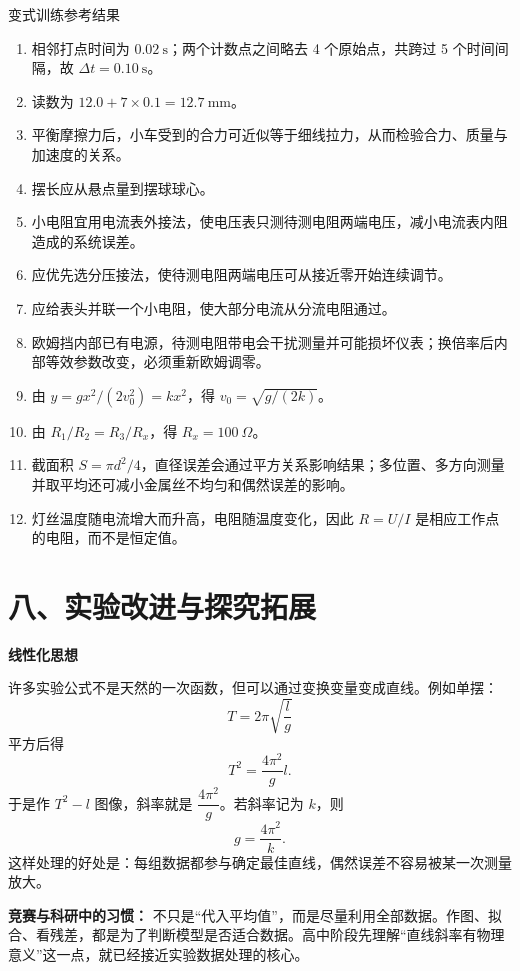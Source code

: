 \pagebreak
\begin{learningbox}{变式训练参考结果}
\begin{enumerate}[itemsep=0.45em,topsep=0.3em,parsep=0pt]
  \item 相邻打点时间为 $0.02\ \mathrm s$；两个计数点之间略去 4 个原始点，共跨过 5 个时间间隔，故 $\Delta t=0.10\ \mathrm s$。
  \item 读数为 $12.0+7\times0.1=12.7\ \mathrm{mm}$。
  \item 平衡摩擦力后，小车受到的合力可近似等于细线拉力，从而检验合力、质量与加速度的关系。
  \item 摆长应从悬点量到摆球球心。
  \item 小电阻宜用电流表外接法，使电压表只测待测电阻两端电压，减小电流表内阻造成的系统误差。
  \item 应优先选分压接法，使待测电阻两端电压可从接近零开始连续调节。
  \item 应给表头并联一个小电阻，使大部分电流从分流电阻通过。
  \item 欧姆挡内部已有电源，待测电阻带电会干扰测量并可能损坏仪表；换倍率后内部等效参数改变，必须重新欧姆调零。
  \item 由 $y=gx^2/(2v_0^2)=kx^2$，得
  $v_0=\sqrt{g/(2k)}$。
  \item 由 $R_1/R_2=R_3/R_x$，得 $R_x=100\ \Omega$。
  \item 截面积 $S=\pi d^2/4$，直径误差会通过平方关系影响结果；多位置、多方向测量并取平均还可减小金属丝不均匀和偶然误差的影响。
  \item 灯丝温度随电流增大而升高，电阻随温度变化，因此 $R=U/I$ 是相应工作点的电阻，而不是恒定值。
\end{enumerate}
\end{learningbox}

\section*{八、实验改进与探究拓展}
\begin{competitionbox}
\textbf{线性化思想}

许多实验公式不是天然的一次函数，但可以通过变换变量变成直线。例如单摆：
\[
T=2\pi\sqrt{\frac{l}{g}}
\]
平方后得
\[
T^2=\frac{4\pi^2}{g}l.
\]
于是作 $T^2-l$ 图像，斜率就是 $\dfrac{4\pi^2}{g}$。若斜率记为 $k$，则
\[
g=\frac{4\pi^2}{k}.
\]
这样处理的好处是：每组数据都参与确定最佳直线，偶然误差不容易被某一次测量放大。

\textbf{竞赛与科研中的习惯：} 不只是“代入平均值”，而是尽量利用全部数据。作图、拟合、看残差，都是为了判断模型是否适合数据。高中阶段先理解“直线斜率有物理意义”这一点，就已经接近实验数据处理的核心。
\end{competitionbox}

